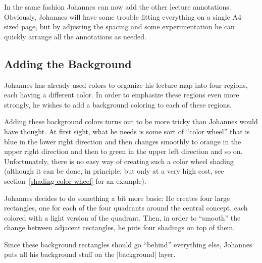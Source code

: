 In the same fashion Johannes can now add the other lecture annotations.
Obviously, Johannes will have some trouble fitting everything on a single
A4-sized page, but by adjusting the spacing and some experimentation he can
quickly arrange all the annotations as needed.


\subsection{Adding the Background}

Johannes has already used colors to organize his lecture map into four regions,
each having a different color. In order to emphasize these regions even more
strongly, he wishes to add a background coloring to each of these regions.

Adding these background colors turns out to be more tricky than Johannes would
have thought. At first sight, what he needs is some sort of ``color wheel''
that is blue in the lower right direction and then changes smoothly to orange
in the upper right direction and then to green in the upper left direction and
so on. Unfortunately, there is no easy way of creating such a color wheel
shading (although it can be done, in principle, but only at a very high cost,
see section~\ref{shading-color-wheel} for an example).

Johannes decides to do something a bit more basic: He creates four large
rectangles, one for each of the four quadrants around the central concept, each
colored with a light version of the quadrant. Then, in order to ``smooth'' the
change between adjacent rectangles, he puts four shadings on top of them.

Since these background rectangles should go ``behind'' everything else,
Johannes puts all his background stuff on the |background| layer.

